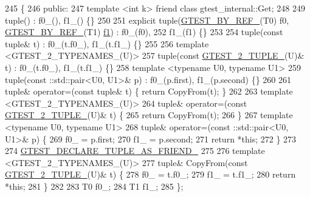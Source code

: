 \begin{DoxyCode}
245                         \{
246  \textcolor{keyword}{public}:
247   \textcolor{keyword}{template} <\textcolor{keywordtype}{int} k> \textcolor{keyword}{friend} \textcolor{keyword}{class }gtest\_internal::Get;
248 
249   tuple() : f0\_(), f1\_() \{\}
250 
251   \textcolor{keyword}{explicit} tuple(\hyperlink{gtest-tuple_8h_adcf9057737a411d833fac0382c13a181}{GTEST\_BY\_REF\_}(T0) f0, \hyperlink{gtest-tuple_8h_adcf9057737a411d833fac0382c13a181}{GTEST\_BY\_REF\_}(T1) 
      \hyperlink{namespacestd_1_1tr1_a9c0fa65b105f8e2f58ba59ecf75fd000}{f1}) : f0\_(f0),
252       f1\_(f1) \{\}
253 
254   tuple(\textcolor{keyword}{const} tuple& t) : f0\_(t.f0\_), f1\_(t.f1\_) \{\}
255 
256   \textcolor{keyword}{template} <GTEST\_2\_TYPENAMES\_(U)>
257   tuple(\textcolor{keyword}{const} \hyperlink{gtest-tuple_8h_a93229c3f009273c73eca237b4d19f326}{GTEST\_2\_TUPLE\_}(U)& t) : f0\_(t.f0\_), f1\_(t.f1\_) \{\}
258   \textcolor{keyword}{template} <\textcolor{keyword}{typename} U0, \textcolor{keyword}{typename} U1>
259   tuple(const ::std::pair<U0, U1>& p) : f0\_(p.first), f1\_(p.second) \{\}
260 
261   tuple& operator=(\textcolor{keyword}{const} tuple& t) \{ \textcolor{keywordflow}{return} CopyFrom(t); \}
262 
263   \textcolor{keyword}{template} <GTEST\_2\_TYPENAMES\_(U)>
264   tuple& operator=(\textcolor{keyword}{const} \hyperlink{gtest-tuple_8h_a93229c3f009273c73eca237b4d19f326}{GTEST\_2\_TUPLE\_}(U)& t) \{
265     \textcolor{keywordflow}{return} CopyFrom(t);
266   \}
267   \textcolor{keyword}{template} <\textcolor{keyword}{typename} U0, \textcolor{keyword}{typename} U1>
268   tuple& operator=(const ::std::pair<U0, U1>& p) \{
269     f0\_ = p.first;
270     f1\_ = p.second;
271     \textcolor{keywordflow}{return} *\textcolor{keyword}{this};
272   \}
273 
274   \hyperlink{gtest-tuple_8h_a2b20671273f514a88a6e9b8328e5f257}{GTEST\_DECLARE\_TUPLE\_AS\_FRIEND\_}
275 
276   \textcolor{keyword}{template} <GTEST\_2\_TYPENAMES\_(U)>
277   tuple& CopyFrom(\textcolor{keyword}{const} \hyperlink{gtest-tuple_8h_a93229c3f009273c73eca237b4d19f326}{GTEST\_2\_TUPLE\_}(U)& t) \{
278     f0\_ = t.f0\_;
279     f1\_ = t.f1\_;
280     \textcolor{keywordflow}{return} *\textcolor{keyword}{this};
281   \}
282 
283   T0 f0\_;
284   T1 f1\_;
285 \};
\end{DoxyCode}
